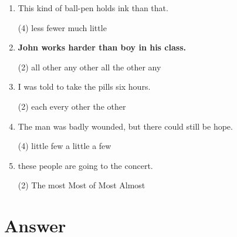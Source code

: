 \begin{enumerate}
\item This kind of ball-pen holds  \ttu ink than that.
  \begin{tasks}(4)
    \task less \task fewer \task much \task little
  \end{tasks}

\item \textbf{John works harder than  \ttu boy in his class.}
  \begin{tasks}(2)
    \task all other \task any other \task all the other \task any
  \end{tasks}

\item I was told to take the pills  \ttu six hours.
  \begin{tasks}(2)
    \task each \task every \task other \task the other
  \end{tasks}


\item The man was badly wounded, but there could still be  \ttu  hope.
  \begin{tasks}(4)
    \task little \task few \task a little \task a few
  \end{tasks}

\item  \ttu  these people are going to the concert.
  \begin{tasks}(2)
    \task The most \task Most of \task Most \task Almost
  \end{tasks}

\end{enumerate}

\section{Answer}

